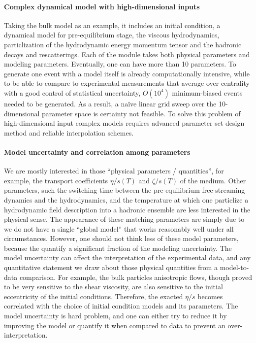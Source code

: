 \paragraph{Complex dynamical model with high-dimensional inputs}
Taking the bulk model as an example, it includes an initial condition, a dynamical model for pre-equilibrium stage, the viscous hydrodynamics, particlization of the hydrodynamic energy momentum tensor and the hadronic decays and rescatterings.
Each of the module takes both physical parameters and modeling parameters.
Eventually, one can have more than 10 parameters.
To generate one event with a model itself is already computationally intensive, while to be able to compare to experimental measurements that average over centrality with a good control of statistical uncertainty, $O(10^4)$ minimum-biased events needed to be generated.
As a result, a na\"ive linear grid sweep over the 10-dimensional parameter space is certainty not feasible.
To solve this problem of high-dimensional input complex models requires advanced parameter set design method and reliable interpolation schemes.


\paragraph{Model uncertainty and correlation among parameters}
We are mostly interested in those ``physical parameters / quantities'', for example, the transport coefficients $\eta/s(T)$ and $\zeta/s(T)$ of the medium.
Other parameters, such the switching time between the pre-equilibrium free-streaming dynamics and the hydrodynamics, and the temperature at which one particlize a hydrodynamic field description into a hadronic ensemble are less interested in the physical sense.
The appearance of these matching parameters are simply due to we do not have a single ``global model'' that works reasonably well under all circumstances.
However, one should not think less of these model parameters, because the quantify a significant fraction of the modeling uncertainty.
The model uncertainty can affect the interpretation of the experimental data, and any quantitative statement we draw about those physical quantities from a model-to-data comparison.
For example, the  bulk particles anisotropic flows, though proved to be very sensitive to the shear viscosity, are also sensitive to the initial eccentricity of the initial conditions.
Therefore, the exacted $\eta/s$ becomes correlated with the choice of initial condition models and its parameters.
The model uncertainty is hard problem, and one can either try to reduce it by improving the model or quantify it when compared to data to prevent an over-interpretation.

